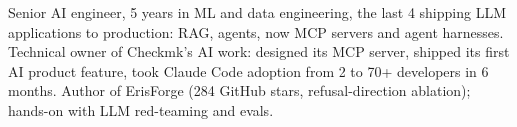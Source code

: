 \begin{cvparagraph}

\RaggedRight
Senior AI engineer, 5 years in ML and data engineering, the last 4 shipping LLM applications to production: RAG, agents, now MCP servers and agent harnesses. Technical owner of Checkmk's AI work: designed its MCP server, shipped its first AI product feature, took Claude Code adoption from 2 to 70+ developers in 6 months. Author of ErisForge (284 GitHub stars, refusal-direction ablation); hands-on with LLM red-teaming and evals.
\end{cvparagraph}
